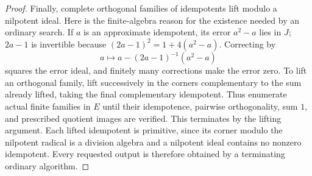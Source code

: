 \begin{proof}
Finally, complete orthogonal families of idempotents lift
modulo a nilpotent ideal. Here is the finite-algebra reason
for the existence needed by an ordinary search. If $a$ is
an approximate idempotent, its error $a^2-a$ lies in $J$;
$2a-1$ is invertible because
$(2a-1)^2=1+4(a^2-a)$. Correcting by
\[
                  a\longmapsto
               a-(2a-1)^{-1}(a^2-a)
\]
squares the error ideal, and finitely many corrections
make the error zero. To lift an orthogonal family, lift
successively in the corners complementary to the sum
already lifted, taking the final complementary idempotent.
Thus enumerate actual finite families in $E$ until their
idempotence, pairwise orthogonality, sum $1$, and prescribed
quotient images are verified. This terminates by the
lifting argument. Each lifted idempotent is primitive,
since its corner modulo the nilpotent radical is a division
algebra and a nilpotent ideal contains no nonzero idempotent.
Every requested output is therefore obtained by a
terminating ordinary algorithm.
\end{proof}
